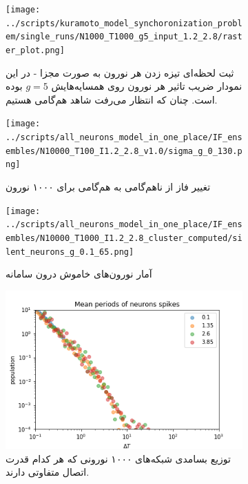 \begin{figure}
	\begin{subfigure}[b]{0.5\textwidth}
		\centering
		\texttt{[image: ../scripts/kuramoto\_model\_synchoronization\_problem/single\_runs/N1000\_T1000\_g5\_input\_1.2\_2.8/raster\_plot.png]}
		\caption{ثبت لحظه‌ای تیزه زدن هر نورون به صورت مجزا - در این نمودار ضریب تاثیر هر نورون روی همسایه‌هایش $g = 5$ بوده است. چنان که انتظار می‌رفت شاهد هم‌گامی هستیم.}
		\label{fig:rasterplot}
	\end{subfigure}
	\hfill
	\begin{subfigure}[b]{0.5\textwidth}
		\centering
		\texttt{[image: ../scripts/all\_neurons\_model\_in\_one\_place/IF\_ensembles/N10000\_T100\_I1.2\_2.8\_v1.0/sigma\_g\_0\_130.png]}
		\caption{تغییر فاز از ناهم‌گامی به هم‌گامی برای ۱۰۰۰ نورون}
		\label{fig:if_phase_transition}
	\end{subfigure}
	\hfill
	\begin{subfigure}[b]{0.5\textwidth}
		\centering
		\texttt{[image: ../scripts/all\_neurons\_model\_in\_one\_place/IF\_ensembles/N10000\_T1000\_I1.2\_2.8\_cluster\_computed/silent\_neurons\_g\_0.1\_65.png]}
		\caption{آمار نورون‌های خاموش درون سامانه}
		\label{fig:if_silent_neurons}
	\end{subfigure}
	\hfill
	\begin{subfigure}[b]{0.5\textwidth}
		\centering
		\includegraphics[width = \textwidth]{../papers_studies/figs/IF/mean_spiking_persiods.png}
		\caption{توزیع بسامدی شبکه‌های ۱۰۰۰ نورونی که هر کدام قدرت اتصال متفاوتی دارند. }
		\label{fig:if_isi}
	\end{subfigure}
	\hfill
	\begin{subfigure}[b]{0.5\textwidth}
		\centering

\end{subfigure}
\end{figure}
